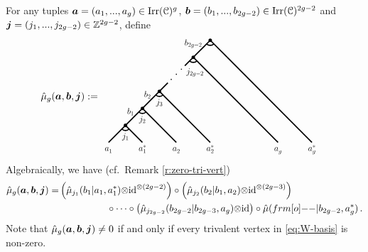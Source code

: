 \documentclass[11pt]{article}
\begin{document}
For any tuples $\bm{a} = (a_1, ..., a_g) \in {\operatorname{Irr}}({\mathcal{C}})^g$, $\bm{b} = (b_1, ..., b_{2g-2}) \in {\operatorname{Irr}}(\mathcal{C})^{2g-2}$ and $\bm{j} = (j_1, ..., j_{2g-2}) \in {\mathbb{Z}}^{2g-2}$, define
\begin{equation}\label{eq:W-basis}
\begin{split}
& \Wbase{g}{a}{b}{j} := 
\vcenter{\hbox{\scalebox{0.6}{
\begin{tikzpicture}[line width=2pt]
\foreach \x in {0,1,2,5}{\BranchDown{(\x, \x)}}
\draw (2,2)--(2.5,2.5);
\begin{scope}[shift={(4,4)}]
\draw (0,0)--(-0.5,-0.5); \draw (0,0)--(1,-1);
\draw ([shift=(225:0.3cm)]0,0) arc (225:315:0.3cm);
\fill[black] (0,0) circle (3pt);
\end{scope}
\node[below] at (-1,-1) {\Large $a_1^{\phantom{*}}$}; \node[below] at (1,-1) {\Large $a_1^*$};
\draw (2,0)--(3,-1); \draw (3,1)--(5,-1);\node[below] at (3,-1) {\Large $a_2^{\phantom{*}}$}; \node[below] at (5,-1) {\Large $a_2^*$};
\draw (5,3)--(9,-1); \draw (6,4)--(11,-1);\node[below] at (9,-1) {\Large $a_g^{\phantom{*}}$}; \node[below] at (11,-1) {\Large $a_g^*$};
\node[below] at (0,-0.3) {\Large $j_1$}; \node at (0.3,0.8) {\Large $b_1$};
\node[below] at (1,0.7) {\Large $j_2$};\node at (1.3,1.8) {\Large $b_2$};
\node[below] at (2,1.7) {\Large $j_3$}; \node at (4,4.8) {\Large $b_{2g-2}$};
\node[below] at (4.1,3.5) {\Large $j_{2g-2}$};
\foreach \x in {1,2,3} {\fill[black] (2.4+0.3*\x,2.4+0.3*\x) circle (1pt);} 
\end{tikzpicture}}}}  
\end{split}
\end{equation}
Algebraically, we have (cf.\ Remark \ref{r:zero-tri-vert})
\begin{equation} 
\label{eq:W-basis-alg}
\begin{split} 
\Wbase{g}{a}{b}{j}
=& \left(\hmu_{j_{1}}(b_1|a_1, a_1^*) \ot \id^{\ot (2g-2)} \right)
\circ\left(\hmu_{j_{2}}(b_2|b_1, a_2) \ot \id^{\ot (2g-3)}\right)\\
&\hspace*{5em}\circ\cdots\circ\left(\hmu_{j_{2g-2}}(b_{2g-2}| b_{2g-3}, a_g) \ot \id \right) \circ \hmu(\1|b_{2g-2}, a_{g}^*)\,.  
\end{split}
\end{equation}
Note that ${\hat{\mu}_{g}(\bm{a}, \bm{b}, \bm{j})} \ne 0$ if and only if every trivalent vertex in \eqref{eq:W-basis} is non-zero. 
\end{document}
